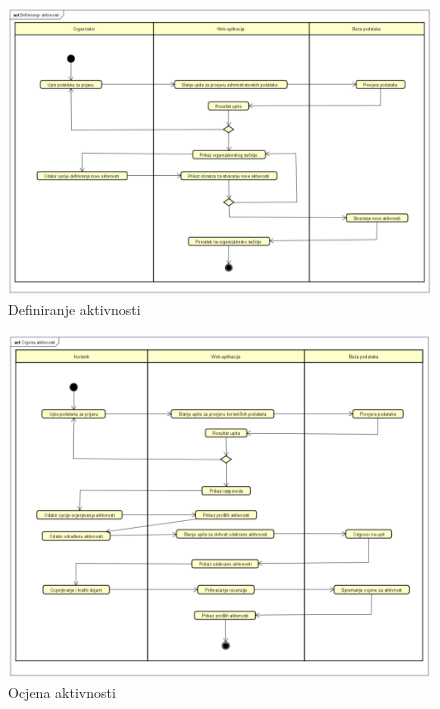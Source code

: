 \begin{figure}[H]
	\includegraphics[scale=0.75]{dokumentacija/dijagrami/activity-definiranjeAktivnosti.PNG} 
	\centering
	\caption{Definiranje aktivnosti}
	\label{fig:promjene}
\end{figure}

\begin{figure}[H]
	\includegraphics[scale=0.75]{dokumentacija/dijagrami/activity-ocjenaAktivnosti.PNG} 
	\centering
	\caption{Ocjena aktivnosti}
	\label{fig:promjene}
\end{figure}

